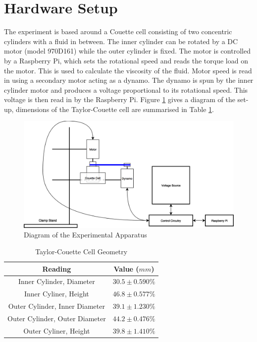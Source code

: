 \documentclass[twoside,a4]{report}
\begin{document}
	\section{Hardware Setup}
	The experiment is based around a Couette cell consisting of two concentric cylinders with a fluid in between. The inner cylinder can be rotated by a DC motor (model 970D161) while the outer cylinder is fixed. The motor is controlled by a Raspberry Pi, which sets the rotational speed and reads the torque load on the motor. This is used to calculate the viscosity of the fluid. Motor speed is read in using a secondary motor acting as a dynamo. The dynamo is spun by the inner cylinder motor and produces a voltage proportional to its rotational speed. This voltage is then read in by the Raspberry Pi.
	Figure \ref{expdia} gives a diagram of the set-up, dimensions of the Taylor-Couette cell are summarised in Table \ref{tabcellgeom}.
	\newline
	\begin{figure}[!htb]
		\centering
		\includegraphics[scale=0.3]{images/exp_set_up.png} %
		\caption{Diagram of the Experimental Apparatus}
		\label{expdia}
	\end{figure}
	\begin{table}
		\centering
		\caption{Taylor-Couette Cell Geometry}
		\label{tabcellgeom}
		\begin{tabular}{|c|c|}
			\hline
			Reading 						& Value ($mm$) \\
			\hline
			Inner Cylinder, Diameter 		& $30.5 \pm 0.590 \%$\\
			Inner Cyliner, Height 			& $46.8 \pm 0.577 \%$\\
			Outer Cylinder, Inner Diameter 	& $39.1 \pm 1.230 \%$\\
			Outer Cylinder, Outer Diameter 	& $44.2 \pm 0.476 \%$\\
			Outer Cyliner, Height 			& $39.8 \pm 1.410 \%$\\
			\hline
		\end{tabular}
	\end{table}
\end{document}
